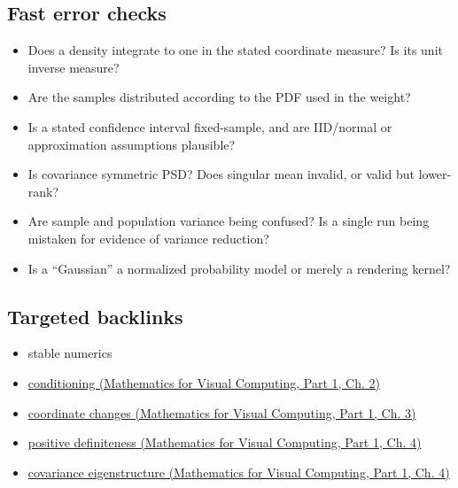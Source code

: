 \subsection{Fast error checks}\label{appendix-cb5af353ef77-fast-error-checks}

\hypertarget{appendix-cb5af353ef77-fast-error-checks}{}

\begin{itemize}
\tightlist
\item
  Does a density integrate to one in the stated coordinate measure? Is its unit inverse measure?
\item
  Are the samples distributed according to the PDF used in the weight?
\item
  Is a stated confidence interval fixed-sample, and are IID/normal or approximation assumptions plausible?
\item
  Is covariance symmetric PSD? Does singular mean invalid, or valid but lower-rank?
\item
  Are sample and population variance being confused? Is a single run being mistaken for evidence of variance reduction?
\item
  Is a ``Gaussian'' a normalized probability model or merely a rendering kernel?
\end{itemize}

\subsection{Targeted backlinks}\label{appendix-cb5af353ef77-targeted-backlinks}

\hypertarget{appendix-cb5af353ef77-targeted-backlinks}{}

\begin{itemize}
\tightlist
\item
  {stable numerics}
\item
  \href{../02-Mathematics-for-Visual-Computing-P01/main.pdf\#01-foundations-i-ch018-an-inverse-can-exist-and-still-amplify-uncertainty}{conditioning (Mathematics for Visual Computing, Part 1, Ch. 2)}
\item
  \href{../02-Mathematics-for-Visual-Computing-P01/main.pdf\#01-foundations-i-ch019-coordinates-can-change-while-the-geometric-object-stays-still}{coordinate changes (Mathematics for Visual Computing, Part 1, Ch. 3)}
\item
  \href{../02-Mathematics-for-Visual-Computing-P01/main.pdf\#01-foundations-i-ch020-positive-definiteness-is-a-structural-promise}{positive definiteness (Mathematics for Visual Computing, Part 1, Ch. 4)}
\item
  \href{../02-Mathematics-for-Visual-Computing-P01/main.pdf\#01-foundations-i-ch020-diagonalization-leads-to-the-stronger-symmetric-spectral-theorem}{covariance eigenstructure (Mathematics for Visual Computing, Part 1, Ch. 4)}
\end{itemize}

